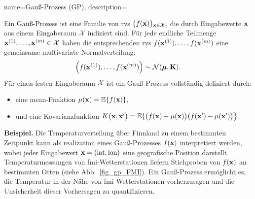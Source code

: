 {{{
{name={Gauß-Prozess (GP)},
	description={Ein Gauß-Prozess ist eine Familie von \gls{rv}s 
		$\{f({\bf x})\}_{{\bf x} \in \mathcal{X}}$, die durch Eingabewerte ${\bf x}$ 
		aus einem Eingaberaum $\mathcal{X}$ indiziert sind. Für jede endliche Teilmenge 
		${\bf x}^{(1)}, \ldots, {\bf x}^{(m)} \in \mathcal{X}$ 
		haben die entsprechenden \gls{rv}s $f({\bf x}^{(1)}), \ldots, f({\bf x}^{(m)})$ 
		eine gemeinsame multivariate Normalverteilung:
		\[
		\left( f({\bf x}^{(1)}), \ldots, f({\bf x}^{(m)}) \right) \sim \mathcal{N}(\boldsymbol{\mu}, \mathbf{K}).
		\]
		Für einen festen Eingaberaum $\mathcal{X}$ ist ein Gauß-Prozess vollständig definiert durch:
		\begin{itemize}
			\item eine \gls{mean}-Funktion $\mu({\bf x}) = \mathbb{E}\{ f({\bf x})\}$,
			\item und eine Kovarianzfunktion $K\big({\bf x},{\bf x}'\big)= \mathbb{E}\{ \big(f({\bf x})-\mu({\bf x})\big) \big(f({\bf x}')-\mu({\bf x}')\big) \big\}$.
		\end{itemize}
		\textbf{Beispiel.} Die Temperaturverteilung über Finnland zu einem bestimmten Zeitpunkt kann als \gls{realization} eines Gauß-Prozesses $f({\bf x})$ interpretiert werden, wobei jeder Eingabewert ${\bf x} = (\text{lat}, \text{lon})$ eine geografische Position darstellt. Temperaturmessungen von \gls{fmi}-Wetterstationen liefern Stichproben von $f({\bf x})$ an bestimmten Orten (siehe Abb.\ \ref{fig_gp_FMI}). Ein Gauß-Prozess ermöglicht es, die Temperatur in der Nähe von \gls{fmi}-Wetterstationen vorherzusagen und die Unsicherheit dieser Vorhersagen zu quantifizieren.
		\begin{figure}[H]
			\begin{center}
\end{center}
\end{figure}}}}}}
